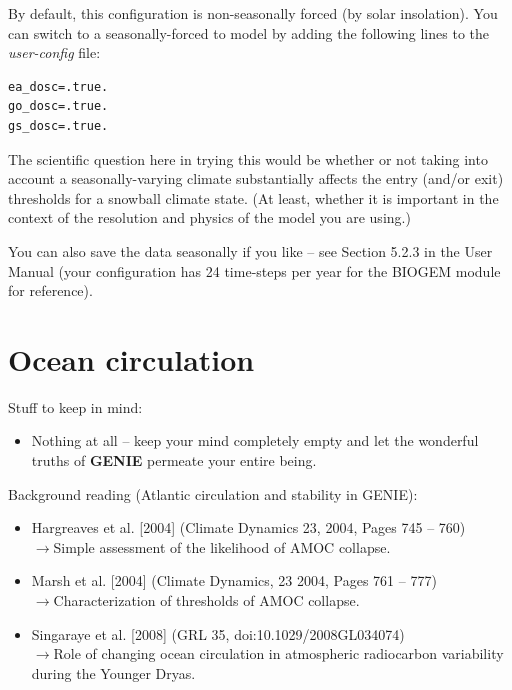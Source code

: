 \documentclass[11pt,fleqn]{book} %
\begin{document}
By default, this configuration is non-seasonally forced (by solar insolation). You can switch to a seasonally-forced to model by adding the following lines to the \textit{user-config} file: 

\begin{verbatim}
ea_dosc=.true.
go_dosc=.true.
gs_dosc=.true.
\end{verbatim}

The scientific question here in trying this would be whether or not taking into account a seasonally-varying climate substantially affects the entry (and/or exit) thresholds for a snowball climate state. (At least, whether it is important in the context of the resolution and physics of the model you are using.)

You can also save the data seasonally if you like – see Section 5.2.3 in the User Manual (your configuration has 24 time-steps per year for the BIOGEM module for reference).


\cleardoublepage


\chapter{Ocean circulation}

\hfill \break

\noindent Stuff to keep in mind:

\begin{itemize}
\item Nothing at all – keep your mind completely empty and let the wonderful truths of \textbf{GENIE} permeate your entire being.
\end{itemize}

\vspace{2mm}
\noindent Background reading (Atlantic circulation and stability in GENIE):

\vspace{2mm}
\begin{itemize}
\item Hargreaves et al. [2004] (Climate Dynamics 23, 2004, Pages 745 – 760)
\\\(\rightarrow\)Simple assessment of the likelihood of AMOC collapse.
\item Marsh et al. [2004] (Climate Dynamics, 23 2004, Pages 761 – 777)
\\\(\rightarrow\)Characterization of thresholds of AMOC collapse.
\item Singaraye et al. [2008] (GRL 35, doi:10.1029/2008GL034074) 
\\\(\rightarrow\)Role of changing ocean circulation in atmospheric radiocarbon variability during the Younger Dryas.
\end{itemize}
\end{document}
